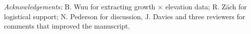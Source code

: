 \documentclass[11pt]{article}
\begin{document}




\emph{Acknowledgements:} B. Wuu for extracting growth $\times$ elevation data; R. Z{\"a}ch for logistical support; N. Pederson for discussion, J. Davies and three reviewers for comments that improved the manuscript. %
\end{document}
